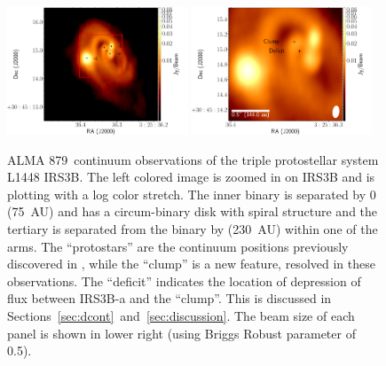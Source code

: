 \begin{figure}[H]
\begin{center}
   \includegraphics[width=0.48\textwidth]{img/L1448IRS3B_cont_robust05triplet_uc_forpos.pdf} %
   \includegraphics[width=0.48\textwidth]{img/L1448IRS3B_cont_robust05triplet_uc_positions.pdf} %
\end{center}
   \caption{ALMA 879~\micron\space continuum observations of the triple protostellar system L1448 IRS3B. The left colored image is zoomed in on IRS3B and is plotting with a log color stretch. The inner binary is separated by 0 (75~AU) and has a circum-binary disk with spiral structure and the tertiary is separated from the binary by  (230~AU) within one of the arms. The ``protostars'' are the continuum positions previously discovered in \citet{2016Natur.538..483T}, while the ``clump'' is a new feature, resolved in these observations. The ``deficit'' indicates the location of depression of flux between IRS3B-a and the ``clump''. This is discussed in Sections~\ref{sec:dcont}~and~\ref{sec:discussion}. The beam size of each panel is shown in lower right (\contbeam\space using Briggs Robust parameter of 0.5).}\label{fig:zoomincont}
\end{figure}


